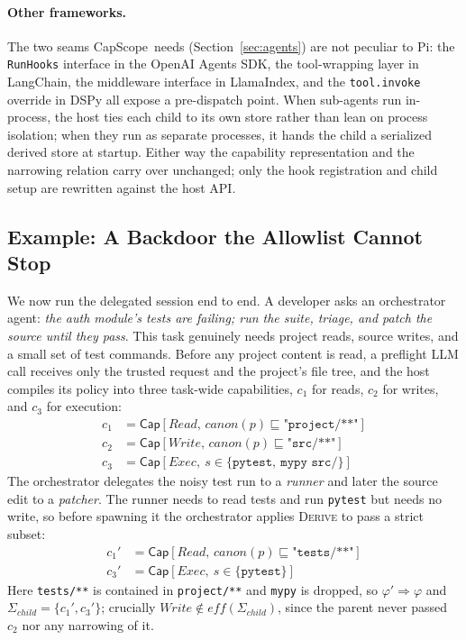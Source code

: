 \documentclass[sigplan,review,anonymous]{acmart}
\newcommand{\tool}{CapScope\xspace}
\renewcommand{\Cap}[2]{\textsf{Cap}[{#1},\,{#2}]}
\newcommand{\rulename}[1]{\textsc{#1}}
\begin{document}
  \paragraph{Other frameworks.}
  The two seams \tool\ needs (Section~\ref{sec:agents}) are not peculiar to Pi:
  the \texttt{RunHooks} interface in the OpenAI Agents SDK, the tool-wrapping
  layer in LangChain, the middleware interface in LlamaIndex, and the
  \texttt{tool.invoke} override in DSPy all expose a pre-dispatch point. When
  sub-agents run in-process, the host ties each child to its own store rather
  than lean on process isolation; when they run as separate processes, it hands
  the child a serialized derived store at startup. Either way the capability
  representation and the narrowing relation carry over unchanged; only the hook
  registration and child setup are rewritten against the host API.
  
  \subsection{Example: A Backdoor the Allowlist Cannot Stop}
  \label{sec:example}
  We now run the delegated session end to end. A developer asks an orchestrator
  agent: \emph{the auth module's tests are failing; run the suite, triage, and
  patch the source until they pass}. This task genuinely needs project reads,
  source writes, and a small set of test commands. Before any project content is
  read, a preflight LLM call receives only the trusted request and the project's
  file tree, and the host compiles its policy into three task-wide capabilities,
  $c_1$ for reads, $c_2$ for writes, and $c_3$ for execution:
  \begin{align}
    c_1 &= \Cap{\mathit{Read}}{\mathit{canon}(p) \sqsubseteq
          \texttt{"project/**"}} \label{cap:read} \\
    c_2 &= \Cap{\mathit{Write}}{\mathit{canon}(p) \sqsubseteq
          \texttt{"src/**"}} \label{cap:edit} \\
    c_3 &= \textsf{Cap}[\mathit{Exec},\ s \in
          \{\texttt{pytest},\ \texttt{mypy src/}\}] \label{cap:exec}
  \end{align}
  The orchestrator delegates the noisy test run to a \emph{runner} and later the
  source edit to a \emph{patcher}. The runner needs to read tests and run
  \texttt{pytest} but needs no write, so before spawning it the orchestrator
  applies \rulename{Derive} to pass a strict subset:
  \begin{align}
    c_1' &= \Cap{\mathit{Read}}{\mathit{canon}(p) \sqsubseteq
            \texttt{"tests/**"}} \label{cap:dread} \\
    c_3' &= \textsf{Cap}[\mathit{Exec},\ s \in \{\texttt{pytest}\}]
            \label{cap:dexec}
  \end{align}
  Here \texttt{tests/**} is contained in \texttt{project/**} and \texttt{mypy}
  is dropped, so $\varphi' \Rightarrow \varphi$ and
  $\Sigma_{\mathit{child}} = \{c_1', c_3'\}$; crucially
  $\mathit{Write} \notin \mathit{eff}(\Sigma_{\mathit{child}})$, since the parent
  never passed $c_2$ nor any narrowing of it.
\end{document}
